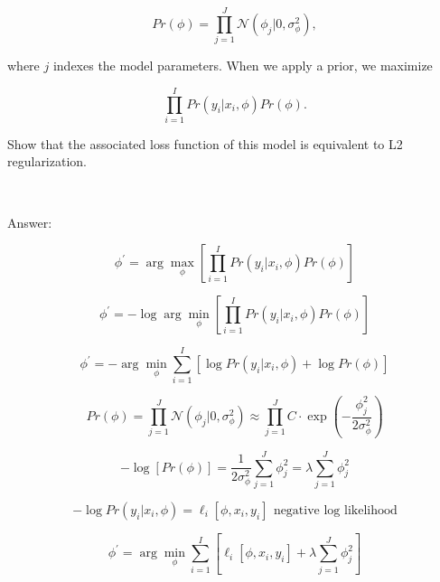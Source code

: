 \documentclass[10pt]{article}
\begin{document}
\begin{equation}
    Pr(\phi) = \prod_{j=1}^{J} \mathcal{N}(\phi_j | 0, \sigma^2_{\phi}),
\end{equation}

\noindent where $j$ indexes the model parameters. When we apply a prior, we maximize

\begin{equation}
    \prod_{i=1}^{I} Pr(y_i | x_i, \phi) Pr(\phi).
\end{equation}

Show that the associated loss function of this model is equivalent to L2 regularization.

\ 

\noindent Answer:

\begin{equation}
     \phi^{'} =  \arg \max_{\phi} [ \prod_{i=1}^{I} Pr(y_i | x_i, \phi) Pr(\phi) ] 
\end{equation}


\begin{equation}
     \phi^{'} = - \log  \arg \min_{\phi} [ \prod_{i=1}^{I} Pr(y_i | x_i, \phi) Pr(\phi) ] 
\end{equation}

\begin{equation}
     \phi^{'} = -  \arg \min_{\phi}  \sum_{i=1}^{I} [ \log  Pr(y_i | x_i, \phi) + \log Pr(\phi) ] 
\end{equation}

\begin{equation}
    Pr(\phi) = \prod_{j=1}^{J} \mathcal{N}(\phi_j | 0, \sigma^2_{\phi}) \approx \prod_{j=1}^{J} C \cdot \exp( - \frac{\phi_j^2 }{2 \sigma^2_{\phi}} )
\end{equation}

\begin{equation}
      -  \log [ Pr(\phi) ]  =  \frac{1}{2 \sigma^2_{\phi}} \sum_{j=1}^{J} \phi_j^2 = \lambda  \sum_{j=1}^{J} \phi_j^2
\end{equation}


\begin{equation}
	- \log  Pr(y_i | x_i, \phi) =  \ell_i [\phi, x_i, y_i]  \,\ \text{negative log likelihood}
\end{equation}

\begin{equation}
     \phi^{'} = \arg \min_{\phi}  \sum_{i=1}^{I} [ \ell_i [\phi, x_i, y_i] + \lambda  \sum_{j=1}^{J} \phi_j^2 ] 
\end{equation}
\end{document}
